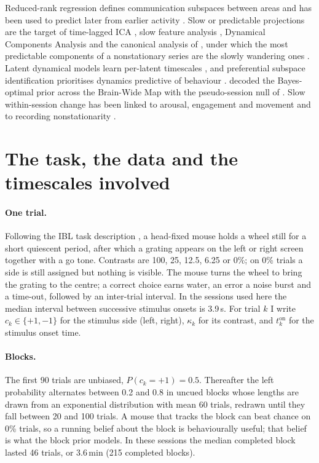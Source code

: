 \documentclass{article}
\begin{document}
Reduced-rank regression \citep{izenman1975,mukherjee2011} defines communication subspaces between areas
\citep{semedo2019} and has been used to predict later from earlier activity \citep{boucher2023}. Slow or predictable
projections are the target of time-lagged ICA \citep{perezhernandez2013}, slow feature analysis \citep{wiskott2002},
Dynamical Components Analysis \citep{clark2019} and the canonical analysis of \citet{boxtiao1977}, under which the most
predictable components of a nonstationary series are the slowly wandering ones \citep[see also][]{antognini2018}.
Latent dynamical models learn per-latent timescales \citep{yu2009,macke2011}, and preferential subspace identification
prioritises dynamics predictive of behaviour \citep{sani2021}. \citet{findling2025} decoded the Bayes-optimal prior
across the Brain-Wide Map \citep{ibl2025bwm} with the pseudo-session null of \citet{harris2020}. Slow within-session change has been linked to arousal,
engagement and movement \citep{cowley2020,okun2019,allen2019,stringer2019} and to recording nonstationarity
\citep{jun2017,iblrepro2025}.

\section{The task, the data and the timescales involved}
\label{sec:task}

\paragraph{One trial.} Following the IBL task description \citep{ibl2021task}, a head-fixed mouse holds a wheel
still for a short quiescent period, after which a grating appears on the left or right screen together with a go
tone. Contrasts are 100, 25, 12.5, 6.25 or 0\%; on 0\% trials a side is still assigned but nothing is visible. The
mouse turns the wheel to bring the grating to the centre; a correct choice earns water, an error a noise burst and a
time-out, followed by an inter-trial interval. In the sessions used here the median interval between successive
stimulus onsets is 3.9\,s. For trial $k$ I write $c_k \in \{+1, -1\}$ for the stimulus side (left, right), $\kappa_k$
for its contrast, and $t^{\mathrm{on}}_k$ for the stimulus onset time.

\paragraph{Blocks.} The first 90 trials are unbiased, $P(c_k = +1) = 0.5$. Thereafter the left probability alternates
between 0.2 and 0.8 in uncued blocks whose lengths are drawn from an exponential distribution with mean 60 trials,
redrawn until they fall between 20 and 100 trials. A mouse that tracks the block can beat chance on 0\% trials, so a
running belief about the block is behaviourally useful; that belief is what the block prior models. In these sessions
the median completed block lasted 46 trials, or 3.6\,min (215 completed blocks).
\end{document}
